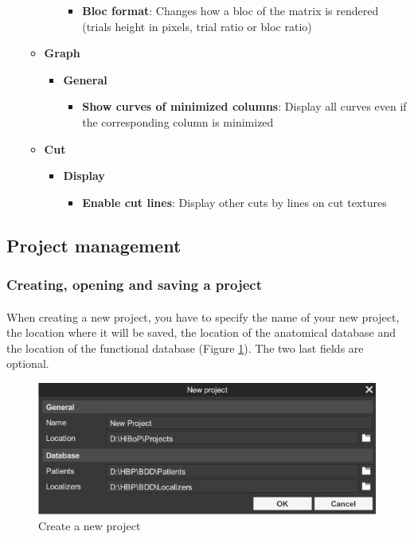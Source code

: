 \documentclass[a4paper]{article}
\begin{document}
\begin{itemize}
\begin{itemize}
\begin{itemize}
\begin{itemize}
\item \textbf{Bloc format}: Changes how a bloc of the matrix is rendered (trials height in pixels, trial ratio or bloc ratio)
\end{itemize}
\end{itemize}
\item \textbf{Graph}
\begin{itemize}
\item \textbf{General}
\begin{itemize}
\item \textbf{Show curves of minimized columns}: Display all curves even if the corresponding column is minimized
\end{itemize}
\end{itemize}
\item \textbf{Cut}
\begin{itemize}
\item \textbf{Display}
\begin{itemize}
\item \textbf{Enable cut lines}: Display other cuts by lines on cut textures
\end{itemize}
\end{itemize}
\end{itemize}
\end{itemize}
\subsection{Project management}
\subsubsection{Creating, opening and saving a project}
\paragraph{} When creating a new project, you have to specify the name of your new project, the location where it will be saved, the location of the anatomical database and the location of the functional database (Figure \ref{newProjectUI}). The two last fields are optional.
\begin{figure}[H]
\begin{center}
\includegraphics[scale=0.5]{NewProject.png}
\end{center}
\caption{\label{newProjectUI}Create a new project}
\end{figure}
\end{document}
